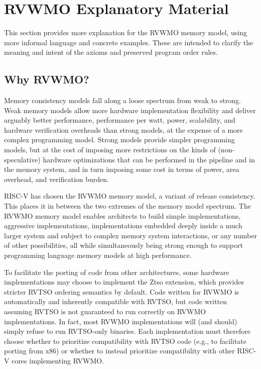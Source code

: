 \newcommand{\diagram}{\textcolor{red}{(picture coming soon)}}

\chapter{RVWMO Explanatory Material}
\label{sec:explanation}
This section provides more explanation for the RVWMO memory model, using more informal language and concrete examples.
These are intended to clarify the meaning and intent of the axioms and preserved program order rules.

\section{Why RVWMO?}
\label{sec:whynottso}

Memory consistency models fall along a loose spectrum from weak to strong.
Weak memory models allow more hardware implementation flexibility and deliver arguably better performance, performance per watt, power, scalability, and hardware verification overheads than strong models, at the expense of a more complex programming model.
Strong models provide simpler programming models, but at the cost of imposing more restrictions on the kinds of (non-speculative) hardware optimizations that can be performed in the pipeline and in the memory system, and in turn imposing some cost in terms of power, area overhead, and verification burden.

RISC-V has chosen the RVWMO memory model, a variant of release consistency.
This places it in between the two extremes of the memory model spectrum.
The RVWMO memory model enables architects to build simple implementations, aggressive implementations, implementations embedded deeply inside a much larger system and subject to complex memory system interactions, or any number of other possibilities, all while simultaneously being strong enough to support programming language memory models at high performance.

To facilitate the porting of code from other architectures, some hardware implementations may choose to implement the Ztso extension, which provides stricter RVTSO ordering semantics by default.
Code written for RVWMO is automatically and inherently compatible with RVTSO, but code written assuming RVTSO is not guaranteed to run correctly on RVWMO implementations.
In fact, most RVWMO implementations will (and should) simply refuse to run RVTSO-only binaries.
Each implementation must therefore choose whether to prioritize compatibility with RVTSO code (e.g., to facilitate porting from x86) or whether to instead prioritize compatibility with other RISC-V cores implementing RVWMO.

